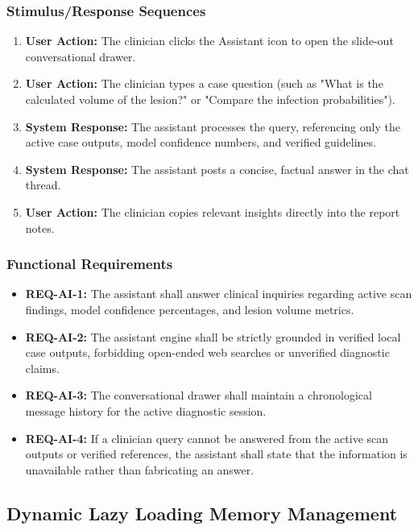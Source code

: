\documentclass[12pt,a4paper]{report}
\begin{document}
\subsubsection{Stimulus/Response Sequences}
\begin{enumerate}
    \item \textbf{User Action:} The clinician clicks the Assistant icon to open the slide-out conversational drawer.
    \item \textbf{User Action:} The clinician types a case question (such as "What is the calculated volume of the lesion?" or "Compare the infection probabilities").
    \item \textbf{System Response:} The assistant processes the query, referencing only the active case outputs, model confidence numbers, and verified guidelines.
    \item \textbf{System Response:} The assistant posts a concise, factual answer in the chat thread.
    \item \textbf{User Action:} The clinician copies relevant insights directly into the report notes.
\end{enumerate}

\subsubsection{Functional Requirements}
\begin{itemize}
    \item \textbf{REQ-AI-1:} The assistant shall answer clinical inquiries regarding active scan findings, model confidence percentages, and lesion volume metrics.
    \item \textbf{REQ-AI-2:} The assistant engine shall be strictly grounded in verified local case outputs, forbidding open-ended web searches or unverified diagnostic claims.
    \item \textbf{REQ-AI-3:} The conversational drawer shall maintain a chronological message history for the active diagnostic session.
    \item \textbf{REQ-AI-4:} If a clinician query cannot be answered from the active scan outputs or verified references, the assistant shall state that the information is unavailable rather than fabricating an answer.
\end{itemize}

\subsection{Dynamic Lazy Loading Memory Management}
\end{document}
